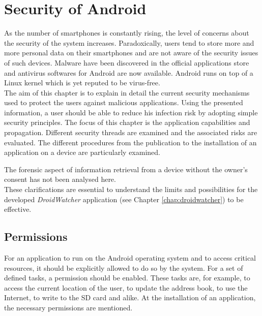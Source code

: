 \chapter{Security of Android}
\label{chap:and-secu}

As the number of smartphones is constantly rising, the level of concerns about the security of the system increases.
Paradoxically, users tend to store more and more personal data on their smartphones and are not aware of the security issues of such devices.
Malware have been discovered in the official applications store and antivirus softwares for Android are now available.
Android runs on top of a Linux kernel which is yet reputed to be virus-free.\\

The aim of this chapter is to explain in detail the current security mechanisms used to protect the users against malicious applications.
Using the presented information, a user should be able to reduce his infection risk by adopting simple security principles.
The focus of this chapter is the application capabilities and propagation.
Different security threads are examined and the associated risks are evaluated.
The different procedures from the publication to the installation of an application on a device are particularly examined.

The forensic aspect of information retrieval from a device without the owner's consent has not been analysed here.\\

These clarifications are essential to understand the limits and possibilities for the developed \emph{DroidWatcher} application (see Chapter \ref{chap:droidwatcher}) to be effective.

\section{Permissions}
\label{sec:permissions}

For an application to run on the Android operating system and to access critical resources, it should be explicitly allowed to do so by the system. %
For a set of defined tasks, a permission should be enabled.
These tasks are, for example, to access the current location of the user, to update the address book, to use the Internet, to write to the SD card and alike.
At the installation of an application, the necessary permissions are mentioned.\\

